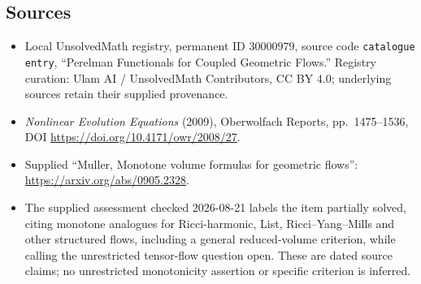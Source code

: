 \documentclass[11pt]{article}
\begin{document}
\subsection{Sources}
\begin{itemize}
\item Local UnsolvedMath registry, permanent ID \(30000979\), source code \texttt{catalogue entry}, ``Perelman Functionals for Coupled Geometric Flows.'' Registry curation: Ulam AI / UnsolvedMath Contributors, CC BY 4.0; underlying sources retain their supplied provenance.
\item \emph{Nonlinear Evolution Equations} (2009), Oberwolfach Reports, pp.\ 1475--1536, DOI \url{https://doi.org/10.4171/owr/2008/27}.
\item Supplied ``Muller, Monotone volume formulas for geometric flows'': \url{https://arxiv.org/abs/0905.2328}.
\item The supplied assessment checked 2026-08-21 labels the item partially solved, citing monotone analogues for Ricci-harmonic, List, Ricci--Yang--Mills and other structured flows, including a general reduced-volume criterion, while calling the unrestricted tensor-flow question open. These are dated source claims; no unrestricted monotonicity assertion or specific criterion is inferred.
\end{itemize}
\end{document}
